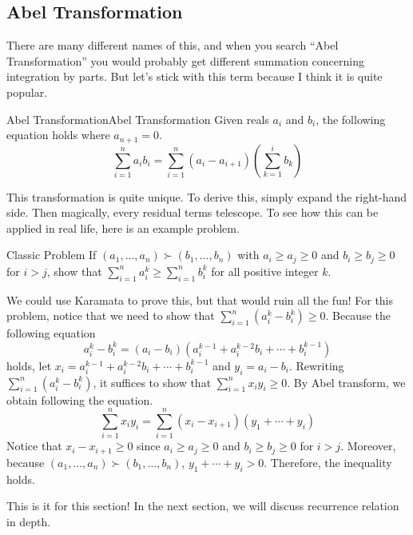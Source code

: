 \documentclass[../../../main.tex]{subfiles}
\begin{document}
\subsection{Abel Transformation}

There are many different names of this, and when you search ``Abel
Transformation'' you would probably get different summation concerning
integration by parts. But let's stick with this term because I think
it is quite popular.

\begin{definition}{Abel Transformation}{Abel Transformation}
Given reals $a_i$ and $b_i$, the following equation holds where
$a_{n+1} = 0$.
\vspace{-0.6\baselineskip}
\[
\sum_{i=1}^n a_i b_i
= \sum_{i=1}^n (a_i - a_{i+1}) \left( \sum_{k=1}^i b_k \right)
\]
\end{definition}

This transformation is quite unique. To derive this, simply
expand the right-hand side. Then magically, every residual terms
telescope. To see how this can be applied in real life,
here is an example problem.

\begin{problem}{Classic Problem}{}
If $(a_1, \ldots, a_n) \succ (b_1, \ldots, b_n)$ with
$a_i \geq a_j \geq 0$ and $b_i \geq b_j \geq 0$ for $i > j$,
show that $\sum_{i=1}^n a_i^k \geq \sum_{i=1}^n b_i^k$ for all
positive integer $k$.
\end{problem}
\begin{solution}
We could use Karamata to prove this, but that would ruin all the fun!
For this problem, notice that we need to show that $\sum_{i=1}^n
(a_i^k - b_i^k) \geq 0$. Because the following equation
\[
a_i^k - b_i^k
= (a_i - b_i) \left(
    a_i^{k-1} + a_i^{k-2} b_i + \cdots + b_i^{k-1}
\right)
\]
holds, let $x_i = a_i^{k-1} + a_i^{k-2} b_i + \cdots + b_i^{k-1}$
and $y_i = a_i - b_i$. Rewriting $\sum_{i=1}^n (a_i^k - b_i^k)$,
it suffices to show that $\sum_{i=1}^n x_i y_i \geq 0$. By Abel
transform, we obtain following the equation.
\[
\sum_{i=1}^n x_i y_i
= \sum_{i=1}^n (x_i - x_{i+1}) (y_1 + \cdots + y_i)
\]
Notice that $x_i - x_{i+1} \geq 0$ since $a_i \geq a_j \geq 0$ and
$b_i \geq b_j \geq 0$ for $i > j$. Moreover, because
$(a_1, \ldots, a_n) \succ (b_1, \ldots, b_n)$, $y_1 + \cdots + y_i
> 0$. Therefore, the inequality holds.
\end{solution}

This is it for this section! In the next section, we will discuss
recurrence relation in depth.
\end{document}
